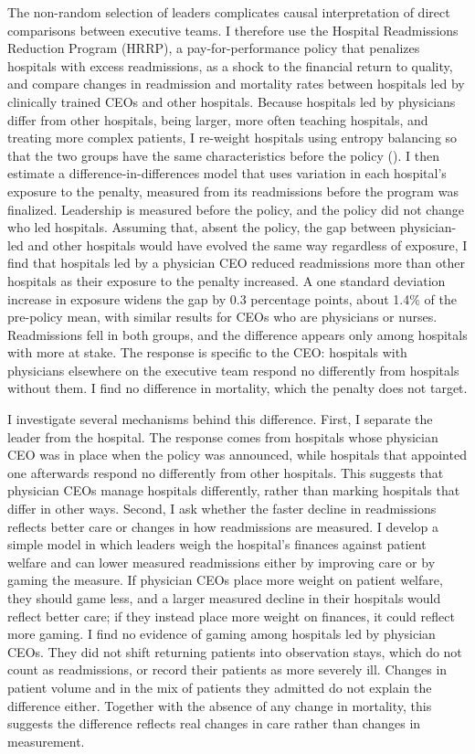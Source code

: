 \documentclass[12pt]{article}
\theoremstyle{definition}   %
\begin{document}
    The non-random selection of leaders complicates causal interpretation of direct comparisons between executive teams. I therefore use the Hospital Readmissions Reduction Program (HRRP), a pay-for-performance policy that penalizes hospitals with excess readmissions, as a shock to the financial return to quality, and compare changes in readmission and mortality rates between hospitals led by clinically trained CEOs and other hospitals. Because hospitals led by physicians differ from other hospitals, being larger, more often teaching hospitals, and treating more complex patients, I re-weight hospitals using entropy balancing so that the two groups have the same characteristics before the policy (\cite{hainmueller2012entropy}). I then estimate a difference-in-differences model that uses variation in each hospital’s exposure to the penalty, measured from its readmissions before the program was finalized. Leadership is measured before the policy, and the policy did not change who led hospitals. Assuming that, absent the policy, the gap between physician-led and other hospitals would have evolved the same way regardless of exposure, I find that hospitals led by a physician CEO reduced readmissions more than other hospitals as their exposure to the penalty increased. A one standard deviation increase in exposure widens the gap by 0.3 percentage points, about 1.4\% of the pre-policy mean, with similar results for CEOs who are physicians or nurses. Readmissions fell in both groups, and the difference appears only among hospitals with more at stake. The response is specific to the CEO: hospitals with physicians elsewhere on the executive team respond no differently from hospitals without them. I find no difference in mortality, which the penalty does not target.

    I investigate several mechanisms behind this difference. First, I separate the leader from the hospital. The response comes from hospitals whose physician CEO was in place when the policy was announced, while hospitals that appointed one afterwards respond no differently from other hospitals. This suggests that physician CEOs manage hospitals differently, rather than marking hospitals that differ in other ways. Second, I ask whether the faster decline in readmissions reflects better care or changes in how readmissions are measured. I develop a simple model in which leaders weigh the hospital’s finances against patient welfare and can lower measured readmissions either by improving care or by gaming the measure. If physician CEOs place more weight on patient welfare, they should game less, and a larger measured decline in their hospitals would reflect better care; if they instead place more weight on finances, it could reflect more gaming. I find no evidence of gaming among hospitals led by physician CEOs. They did not shift returning patients into observation stays, which do not count as readmissions, or record their patients as more severely ill. Changes in patient volume and in the mix of patients they admitted do not explain the difference either. Together with the absence of any change in mortality, this suggests the difference reflects real changes in care rather than changes in measurement.
\end{document}

